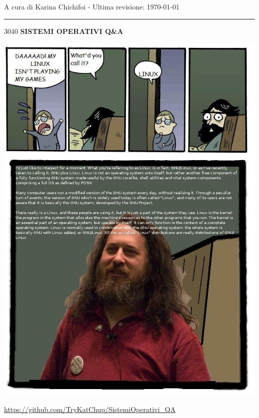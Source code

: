 \documentclass{article}
\makeatletter
\newcommand\HUGE{\@setfontsize\Huge{30}{40}}
\makeatother
\begin{document}
\begin{titlepage}
	\centering
	\large
	A cura di Karina Chichifoi - Ultima revisione: \today
	
	\noindent\rule{15cm}{0.2pt}
	
	\vspace{1.5cm}
	
	\HUGE
	\textbf{SISTEMI OPERATIVI Q\&A}
	
	\vspace{1.5cm}
	
	\includegraphics[scale=0.6]{ab6.jpg}
	
	\vspace{1.5cm}
	
	\normalsize
	\url{https://github.com/TryKatChup/SistemiOperativi_QA}
	
	\clearpage
\end{titlepage}
\renewcommand{\abstractname}{}
\end{document}
